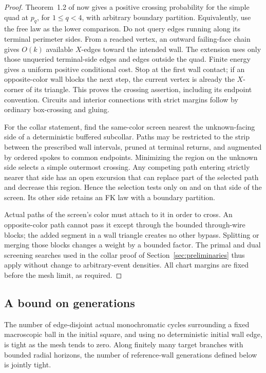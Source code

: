 \begin{proof}
Theorem~1.2 of \citet{DMT2021Fractal} now gives a positive crossing
probability for the simple quad at $p_q$, for $1\le q<4$, with arbitrary
boundary partition.  Equivalently, use the free law as the lower
comparison.  Do not query edges running along its terminal perimeter
sides.  From a reached vertex, an outward failing-face chain gives
$O(k)$ available $X$-edges toward the intended wall.  The extension
uses only those unqueried terminal-side edges and edges outside the
quad.  Finite energy gives a uniform positive conditional cost.  Stop
at the first wall contact; if an opposite-color wall blocks the next
step, the current vertex is already the $X$-corner of its triangle.
This proves the crossing assertion, including its endpoint convention.
Circuits and interior connections with strict margins follow by
ordinary box-crossing and gluing.

For the collar statement, find the same-color screen nearest the
unknown-facing side of a deterministic buffered subcollar.  Paths may
be restricted to the strip between the prescribed wall intervals,
pruned at terminal returns, and augmented by ordered spokes to common
endpoints.  Minimizing the region on the unknown side selects a
simple outermost crossing.  Any competing path entering strictly
nearer that side has an open excursion that can replace part of the
selected path and decrease this region.  Hence the selection tests
only on and on that side of the screen.  Its other side retains an
FK law with a boundary partition.

Actual paths of the screen's color must attach to it in order to cross.
An opposite-color path cannot pass it except through the bounded
through-wire blocks; the added segment in a wall triangle creates no
other bypass.  Splitting or merging those blocks changes a weight by
a bounded factor.  The primal and dual screening searches used in the
collar proof of Section~\ref{sec:preliminaries} thus apply without
change to arbitrary-event densities.  All chart margins are fixed
before the mesh limit, as required.
\end{proof}

\subsection{A bound on generations}
\label{peel:generations}

\begin{lemma}
\label{peel:passages}
The number of edge-disjoint actual monochromatic cycles surrounding a
fixed macroscopic ball in the initial square, and using no deterministic
initial wall edge, is tight as the mesh tends to zero.  Along finitely
many target branches with bounded radial horizons, the number of
reference-wall generations defined below is jointly tight.
\end{lemma}

